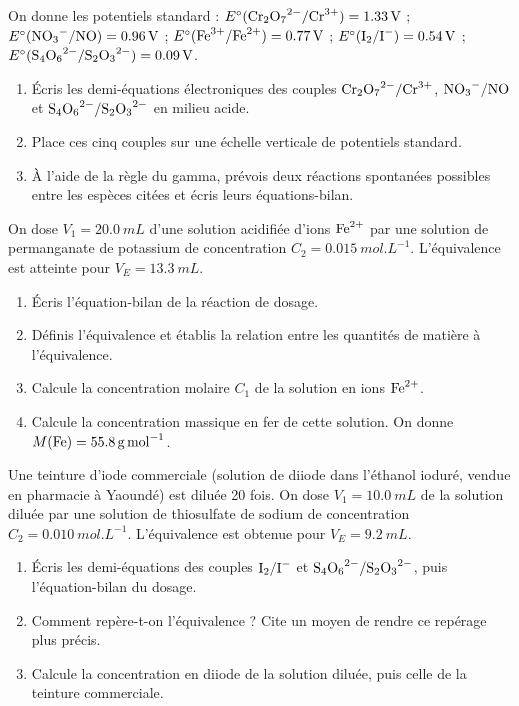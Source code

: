 \documentclass[11pt]{article}
\newcounter{popsec}
\newcounter{popsub}
\newcommand{\courssub}[1]{%
  \stepcounter{popsub}%
  \par\vspace{9pt}\noindent{\popxbold\fontsize{11.5}{13}\selectfont\color{popink}{\color{poporange}\thepopsec.\thepopsub}\hspace{6pt}#1}\par\nopagebreak\vspace{4pt}
}
\begin{document}
\courssub{Je m'entraîne}

\begin{exercice}
On donne les potentiels standard : $E^\circ(\ce{Cr2O7^2-}/\ce{Cr^3+}) = \SI{1,33}{V}$ ; $E^\circ(\ce{NO3-}/\ce{NO}) = \SI{0,96}{V}$ ; $E^\circ(\ce{Fe^3+}/\ce{Fe^2+}) = \SI{0,77}{V}$ ; $E^\circ(\ce{I2}/\ce{I-}) = \SI{0,54}{V}$ ; $E^\circ(\ce{S4O6^2-}/\ce{S2O3^2-}) = \SI{0,09}{V}$.
\begin{enumerate}
\item Écris les demi-équations électroniques des couples $\ce{Cr2O7^2-}/\ce{Cr^3+}$, $\ce{NO3-}/\ce{NO}$ et $\ce{S4O6^2-}/\ce{S2O3^2-}$ en milieu acide.
\item Place ces cinq couples sur une échelle verticale de potentiels standard.
\item À l'aide de la règle du gamma, prévois deux réactions spontanées possibles entre les espèces citées et écris leurs équations-bilan.
\end{enumerate}
\end{exercice}

\begin{exercice}
On dose $V_1 = \SI{20,0}{mL}$ d'une solution acidifiée d'ions $\ce{Fe^2+}$ par une solution de permanganate de potassium de concentration $C_2 = \SI{0,015}{mol.L^{-1}}$. L'équivalence est atteinte pour $V_E = \SI{13,3}{mL}$.
\begin{enumerate}
\item Écris l'équation-bilan de la réaction de dosage.
\item Définis l'équivalence et établis la relation entre les quantités de matière à l'équivalence.
\item Calcule la concentration molaire $C_1$ de la solution en ions $\ce{Fe^2+}$.
\item Calcule la concentration massique en fer de cette solution. On donne $M(\ce{Fe}) = \SI{55,8}{g.mol^{-1}}$.
\end{enumerate}
\end{exercice}

\begin{exercice}
Une teinture d'iode commerciale (solution de diiode dans l'éthanol ioduré, vendue en pharmacie à Yaoundé) est diluée 20 fois. On dose $V_1 = \SI{10,0}{mL}$ de la solution diluée par une solution de thiosulfate de sodium de concentration $C_2 = \SI{0,010}{mol.L^{-1}}$. L'équivalence est obtenue pour $V_E = \SI{9,2}{mL}$.
\begin{enumerate}
\item Écris les demi-équations des couples $\ce{I2}/\ce{I-}$ et $\ce{S4O6^2-}/\ce{S2O3^2-}$, puis l'équation-bilan du dosage.
\item Comment repère-t-on l'équivalence ? Cite un moyen de rendre ce repérage plus précis.
\item Calcule la concentration en diiode de la solution diluée, puis celle de la teinture commerciale.
\end{enumerate}
\end{exercice}
\end{document}
